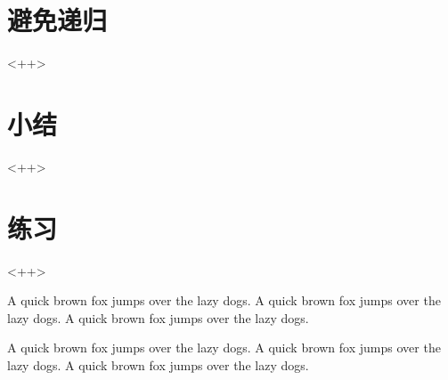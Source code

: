 \section{避免递归}<++>

\section{小结}<++>

\section{练习}<++>

A quick brown fox jumps over the lazy dogs.
A quick brown fox jumps over the lazy dogs.
A quick brown fox jumps over the lazy dogs.

A quick brown fox jumps over the lazy dogs.
A quick brown fox jumps over the lazy dogs.
A quick brown fox jumps over the lazy dogs.



